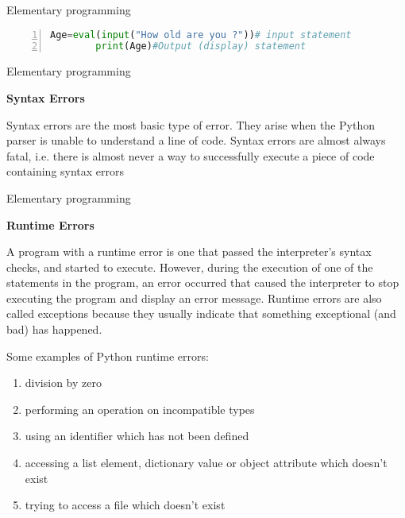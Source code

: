 \begin{frame}[fragile]{Elementary programming}
    \begin{lstlisting}[numbers=left,showstringspaces=false,language=python]
        Age=eval(input("How old are you ?"))# input statement
        print(Age)#Output (display) statement
    \end{lstlisting}
\end{frame}
\begin{frame}[fragile]{Elementary programming}
    \begin{center}{\bf Syntax Errors}\end{center}
  Syntax errors are the most basic type of error. They arise when the Python parser is unable to understand a line of code. Syntax errors are almost always fatal, i.e. there is almost never a way to successfully execute a piece of code containing syntax errors
\end{frame}
\begin{frame}[fragile]{Elementary programming}
  
\begin{center}{\bf Runtime Errors}\end{center}

 A program with a runtime error is one that passed the interpreter's syntax checks, and started to execute. However, during the execution of one of the statements in the program, an error occurred that caused the interpreter to stop executing the program and display an error message.  Runtime errors are also called exceptions because they usually indicate that something exceptional (and bad) has happened.



 Some examples of Python runtime errors:
 \begin{enumerate}[<+->]
   \item  division by zero 
   \item performing an operation on incompatible types 
   \item using an identifier which has not been defined 
   \item accessing a list element, dictionary value or object attribute which doesn't exist 
   \item trying to access a file which doesn't exist    
 \end{enumerate}

\end{frame}
